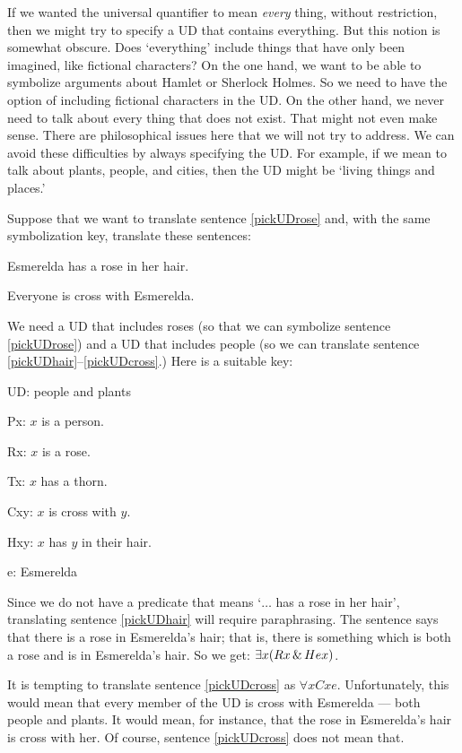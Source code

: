 If we wanted the universal quantifier to mean \emph{every} thing, without restriction, then we might try to specify a UD that contains everything. But this notion is somewhat obscure. Does `everything' include things that have only been imagined, like fictional characters? On the one hand, we want to be able to symbolize arguments about Hamlet or Sherlock Holmes. So we need to have the option of including fictional characters in the UD. On the other hand, we never need to talk about every thing that does not exist. That might not even make sense. There are philosophical issues here that we will not try to address. We can avoid these difficulties by always specifying the UD. For example, if we mean to talk about plants, people, and cities, then the UD might be `living things and places.'

Suppose that we want to translate sentence \ref{pickUDrose} and, with the same symbolization key, translate these sentences:

\begin{earg}
\item[\ex{pickUDhair}] Esmerelda has a rose in her hair.
\item[\ex{pickUDcross}] Everyone is cross with Esmerelda.
\end{earg}

We need a UD that includes roses (so that we can symbolize sentence \ref{pickUDrose}) and a UD that includes people (so we can translate sentence \ref{pickUDhair}--\ref{pickUDcross}.) Here is a suitable key:
\begin{ekey}
\item[UD:] people and plants
\item[Px:] $x$ is a person.
\item[Rx:] $x$ is a rose.
\item[Tx:] $x$ has a thorn.
\item[Cxy:] $x$ is cross with $y$.
\item[Hxy:] $x$ has $y$ in their hair.
\item[e:] Esmerelda
\end{ekey}

Since we do not have a predicate that means `$\ldots$ has a rose in her hair', translating sentence \ref{pickUDhair} will require paraphrasing. The sentence says that there is a rose in Esmerelda's hair; that is, there is something which is both a rose and is in Esmerelda's hair. So we get: $\exists x(Rx \,\&\, Hex)$.

It is tempting to translate sentence \ref{pickUDcross} as $\forall x Cxe$. Unfortunately, this would mean that every member of the UD is cross with Esmerelda --- both people and plants. It would mean, for instance, that the rose in Esmerelda's hair is cross with her. Of course, sentence \ref{pickUDcross} does not mean that.

